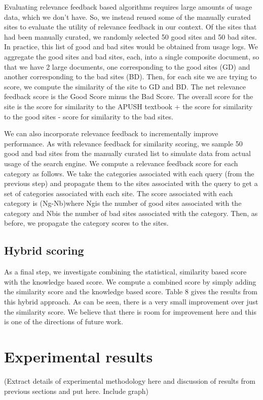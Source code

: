 \documentclass{acm_proc_article-sp}
\begin{document}
Evaluating relevance feedback based algorithms requires large amounts of usage
data, which we don’t have. So, we instead reused some of the manually curated
sites to evaluate the utility of relevance feedback in our context. Of the sites
that had been manually curated, we randomly selected 50 good sites and 50 bad
sites. In practice, this list of good and bad sites would be obtained from usage
logs. We aggregate the good sites and bad sites, each, into a single composite
document, so that we have 2 large documents, one corresponding to the good sites
(GD) and another corresponding to the bad sites (BD). Then, for each site we are
trying to score, we compute the similarity of the site to GD and BD. The net
relevance feedback score is the Good Score minus the Bad Score. The overall
score for the site is the score for similarity to the APUSH textbook + the score
for similarity to the good sites - score for similarity to the bad sites. 

We can also incorporate relevance feedback to incrementally improve
performance. As with relevance feedback for similarity scoring, we sample 50
good and bad sites from the manually curated list to simulate data from actual
usage of the search engine. We compute a relevance feedback score for each
category as follows. We take the categories associated with each query (from the
previous step) and propagate them to the sites associated with the query to get
a set of categories associated with each site. The score associated with each
category is (Ng-Nb)where Ngis the number of good sites associated with the
category and Nbis the number of bad sites associated with the category. Then, as
before, we propagate the category scores to the sites.  

\subsection{Hybrid scoring}

As a final step, we investigate combining the statistical, similarity based
score with the knowledge based score. We compute a combined score by simply
adding the similarity score and the knowledge based score. Table 8 gives the
results from this hybrid approach. As can be seen, there is a very small
improvement over just the similarity score. We believe that there is room for
improvement here and this is one of the directions of future work. 

\section{Experimental results}

(Extract details of experimental methodology here and discussion of results from
previous sections and put here. Include graph)



\end{document}
